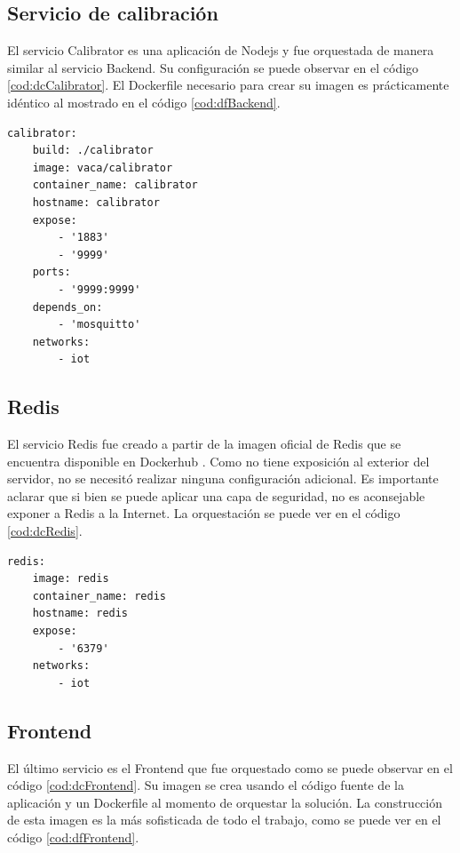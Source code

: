 \subsection{Servicio de calibración}

El servicio Calibrator es una aplicación de Nodejs y fue orquestada de manera similar al servicio Backend.
Su configuración se puede observar en el código \ref{cod:dcCalibrator}.
El Dockerfile necesario para crear su imagen es prácticamente idéntico al mostrado en el código \ref{cod:dfBackend}.

\begin{lstlisting}[label=cod:dcCalibrator,caption=Orquestación del servicio Calibrator.]
calibrator:
	build: ./calibrator
	image: vaca/calibrator
	container_name: calibrator
	hostname: calibrator
	expose: 
		- '1883'
		- '9999'
	ports:
		- '9999:9999'
	depends_on: 
		- 'mosquitto'
	networks: 
		- iot
\end{lstlisting}

\subsection{Redis}

El servicio Redis fue creado a partir de la imagen oficial de Redis que se encuentra disponible en Dockerhub \citep{contrib:redis}.
Como no tiene exposición al exterior del servidor, no se necesitó realizar ninguna configuración adicional.
Es importante aclarar que si bien se puede aplicar una capa de seguridad, no es aconsejable exponer a Redis a la Internet.
La orquestación se puede ver en el código \ref{cod:dcRedis}.

\begin{lstlisting}[label=cod:dcRedis,caption=Orquestación del servicio Redis.]
redis:
	image: redis
	container_name: redis
	hostname: redis
	expose:
		- '6379'
	networks: 
		- iot
\end{lstlisting}

\newpage

\subsection{Frontend}

El último servicio es el Frontend que fue orquestado como se puede observar en el código \ref{cod:dcFrontend}.
Su imagen se crea usando el código fuente de la aplicación y un Dockerfile al momento de orquestar la solución.
La construcción de esta imagen es la más sofisticada de todo el trabajo, como se puede ver en el código \ref{cod:dfFrontend}.


